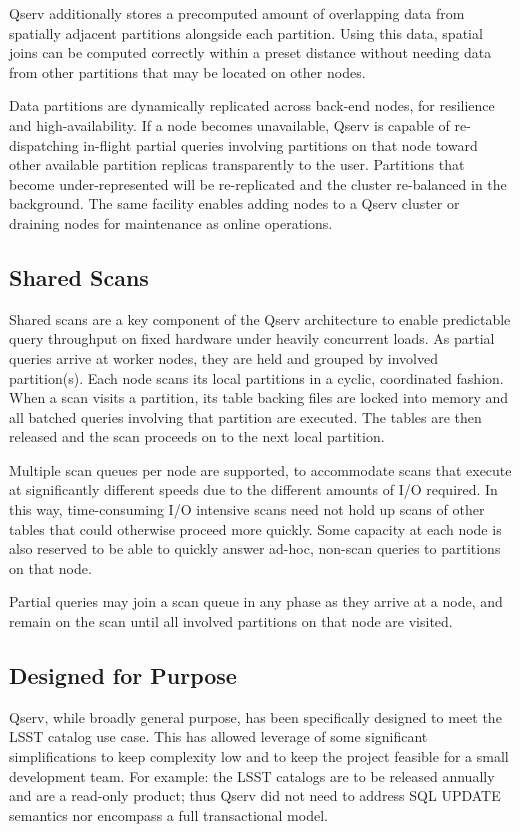 \documentclass[11pt,twoside]{article}
\begin{document}
Qserv additionally stores a precomputed amount of overlapping data from spatially adjacent partitions
alongside each partition.  Using this data, spatial joins can be computed correctly within a preset
distance without needing data from other partitions that may be located on other nodes.

Data partitions are dynamically replicated across back-end nodes, for resilience and high-availability.  If a
node becomes unavailable, Qserv is capable of re-dispatching in-flight partial queries involving partitions on
that node toward other available partition replicas transparently to the user.  Partitions that become
under-represented will be re-replicated and the cluster re-balanced in the background.  The same facility
enables adding nodes to a Qserv cluster or draining nodes for maintenance as online operations.

\subsection{Shared Scans}

Shared scans are a key component of the Qserv architecture to enable predictable query throughput on fixed
hardware under heavily concurrent loads.  As partial queries arrive at worker nodes, they are held and grouped
by involved partition(s).  Each node scans its local partitions in a cyclic, coordinated fashion. When a scan
visits a partition, its table backing files are locked into memory and all batched queries involving that
partition are executed.  The tables are then released and the scan proceeds on to the next local partition.

Multiple scan queues per node are supported, to accommodate scans that execute at significantly different
speeds due to the different amounts of I/O required.  In this way, time-consuming I/O intensive scans need not
hold up scans of other tables that could otherwise proceed more quickly.  Some capacity at each node is also
reserved to be able to quickly answer ad-hoc, non-scan queries to partitions on that node.

Partial queries may join a scan queue in any phase as they arrive at a node, and remain on the scan until all
involved partitions on that node are visited.

\subsection{Designed for Purpose}

Qserv, while broadly general purpose, has been specifically designed to meet the LSST catalog use case.  This
has allowed leverage of some significant simplifications to keep complexity low and to keep the project
feasible for a small development team.  For example: the LSST catalogs are to be released annually and are a
read-only product; thus Qserv did not need to address SQL UPDATE semantics nor encompass a full transactional
model.
\end{document}
